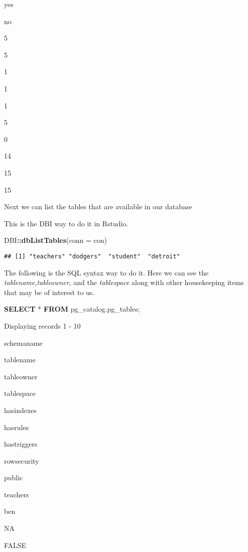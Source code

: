 \documentclass[]{book}
\newenvironment{Shaded}{\begin{snugshade}}{\end{snugshade}}
\newcommand{\KeywordTok}[1]{\textcolor[rgb]{0.13,0.29,0.53}{\textbf{#1}}}
\newcommand{\DataTypeTok}[1]{\textcolor[rgb]{0.13,0.29,0.53}{#1}}
\newcommand{\OperatorTok}[1]{\textcolor[rgb]{0.81,0.36,0.00}{\textbf{#1}}}
\newcommand{\NormalTok}[1]{#1}
\begin{document}
yes

no

5

5

1

1

1

5

0

14

15

15

Next we can list the tables that are available in our database

This is the DBI way to do it in Rstudio.

\begin{Shaded}
\begin{Highlighting}[]
\NormalTok{DBI}\OperatorTok{::}\KeywordTok{dbListTables}\NormalTok{(}\DataTypeTok{conn =}\NormalTok{ con)}
\end{Highlighting}
\end{Shaded}

\begin{verbatim}
## [1] "teachers" "dodgers"  "student"  "detroit"
\end{verbatim}

The following is the SQL syntax way to do it. Here we can see the
\emph{tablename,tableowner}, and the \emph{tablespace} along with other
housekeeping items that may be of interest to us.

\begin{Shaded}
\begin{Highlighting}[]
\KeywordTok{SELECT}\NormalTok{ * }\KeywordTok{FROM}\NormalTok{ pg_catalog.pg_tables;}
\end{Highlighting}
\end{Shaded}

\label{tab:unnamed-chunk-13}Displaying records 1 - 10

schemaname

tablename

tableowner

tablespace

hasindexes

hasrules

hastriggers

rowsecurity

public

teachers

ben

NA

FALSE
\end{document}
